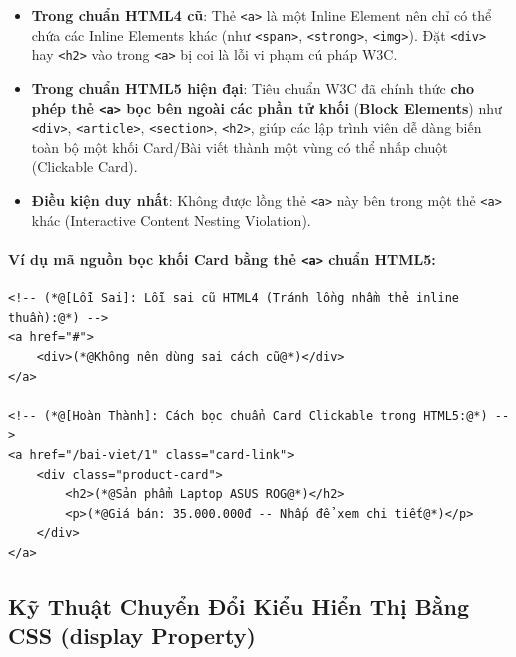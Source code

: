 \documentclass[11pt,oneside]{book}
\newcommand{\codeinline}[1]{\textcolor{accentOrange}{\texttt{#1}}}
\newcommand{\term}[1]{\textbf{\textcolor{primaryBlue}{#1}}}
\begin{document}
\begin{noteBox}
\begin{itemize}[leftmargin=1.5em, itemsep=3pt, parsep=0pt]
    \item \textbf{Trong chuẩn HTML4 cũ}: Thẻ \codeinline{<a>} là một Inline Element nên chỉ có thể chứa các Inline Elements khác (như \codeinline{<span>}, \codeinline{<strong>}, \codeinline{<img>}). Đặt \codeinline{<div>} hay \codeinline{<h2>} vào trong \codeinline{<a>} bị coi là lỗi vi phạm cú pháp W3C.
    \item \textbf{Trong chuẩn HTML5 hiện đại}: Tiêu chuẩn W3C đã chính thức \textbf{cho phép thẻ \codeinline{<a>} bọc bên ngoài các phần tử khối} (\term{Block Elements}) như \codeinline{<div>}, \codeinline{<article>}, \codeinline{<section>}, \codeinline{<h2>}, giúp các lập trình viên dễ dàng biến toàn bộ một khối Card/Bài viết thành một vùng có thể nhấp chuột (Clickable Card).
    \item \textbf{Điều kiện duy nhất}: Không được lồng thẻ \codeinline{<a>} này bên trong một thẻ \codeinline{<a>} khác (Interactive Content Nesting Violation).
\end{itemize}
\end{noteBox}

\paragraph{Ví dụ mã nguồn bọc khối Card bằng thẻ \codeinline{<a>} chuẩn HTML5:}
\begin{codeWindow}
\begin{lstlisting}[language=HTML5]
<!-- (*@[Lỗi Sai]: Lỗi sai cũ HTML4 (Tránh lồng nhầm thẻ inline thuần):@*) -->
<a href="#">
    <div>(*@Không nên dùng sai cách cũ@*)</div>
</a>

<!-- (*@[Hoàn Thành]: Cách bọc chuẩn Card Clickable trong HTML5:@*) -->
<a href="/bai-viet/1" class="card-link">
    <div class="product-card">
        <h2>(*@Sản phẩm Laptop ASUS ROG@*)</h2>
        <p>(*@Giá bán: 35.000.000đ -- Nhấp để xem chi tiết@*)</p>
    </div>
</a>
\end{lstlisting}
\end{codeWindow}

\subsection{Kỹ Thuật Chuyển Đổi Kiểu Hiển Thị Bằng CSS (display Property)}
\end{document}

